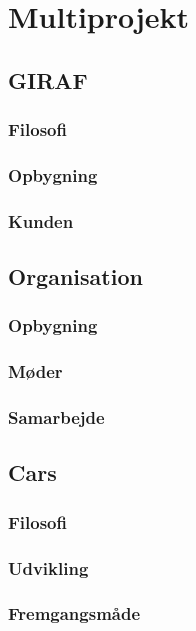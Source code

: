 \section{Multiprojekt}

\subsection{GIRAF}

\begin{frame}
\frametitle{Filosofi}

\end{frame}

\begin{frame}
\frametitle{Opbygning}

\end{frame}

\begin{frame}
\frametitle{Kunden}

\end{frame}

\subsection{Organisation}

\begin{frame}
\frametitle{Opbygning}

\end{frame}

\begin{frame}
\frametitle{Møder}

\end{frame}

\begin{frame}
\frametitle{Samarbejde}

\end{frame}

\subsection{Cars}

\begin{frame}
\frametitle{Filosofi}

\end{frame}

\begin{frame}
\frametitle{Udvikling}

\end{frame}

\begin{frame}
\frametitle{Fremgangsmåde}

\end{frame}